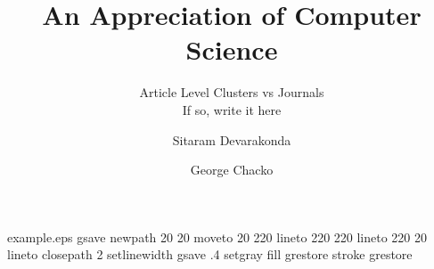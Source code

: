 %
%
%
%
%
\begin{filecontents*}{example.eps}
gsave
newpath
  20 20 moveto
  20 220 lineto
  220 220 lineto
  220 20 lineto
closepath
2 setlinewidth
gsave
  .4 setgray fill
grestore
stroke
grestore
\end{filecontents*}
%
\RequirePackage{fix-cm}
%
\documentclass[smallextended]{svjour3}       %
%
\smartqed  %
%
\usepackage{graphicx}
%
%
%
%
%


\title{An Appreciation of Computer Science%
}
\subtitle{Article Level Clusters vs Journals\\ If so, write it here}


\author{Sitaram Devarakonda         \and
        George Chacko %
}



